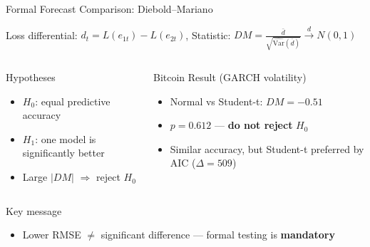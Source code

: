 \documentclass[9pt, aspectratio=169, t]{beamer}
\begin{document}
\begin{frame}{Formal Forecast Comparison: Diebold--Mariano}
    \vspace{-0.2cm}
    \begin{defn}
        Loss differential: $d_t = L(e_{1t}) - L(e_{2t})$, \quad Statistic: $DM = \frac{\bar{d}}{\sqrt{\widehat{\text{Var}}(\bar{d})}} \xrightarrow{d} N(0,1)$
    \end{defn}

    \vspace{-0.1cm}

    \begin{columns}[T]
        \begin{block}{Hypotheses}
            \begin{itemize}\setlength{\itemsep}{0pt}
                \item $H_0$: equal predictive accuracy
                \item $H_1$: one model is significantly better
                \item Large $|DM|$ $\Rightarrow$ reject $H_0$
            \end{itemize}
        \end{block}

        \begin{exampleblock}{Bitcoin Result (GARCH volatility)}
            \begin{itemize}\setlength{\itemsep}{0pt}
                \item Normal vs Student-t: $DM = -0.51$
                \item $p = 0.612$ --- \textbf{do not reject} $H_0$
                \item Similar accuracy, but Student-t preferred by AIC ($\Delta = 509$)
            \end{itemize}
        \end{exampleblock}
    \end{columns}

    \vspace{0.1cm}

    \begin{alertblock}{Key message}
        \begin{itemize}\setlength{\itemsep}{0pt}
            \item Lower RMSE $\neq$ significant difference --- formal testing is \textbf{mandatory}
        \end{itemize}
    \end{alertblock}
\end{frame}
\end{document}
